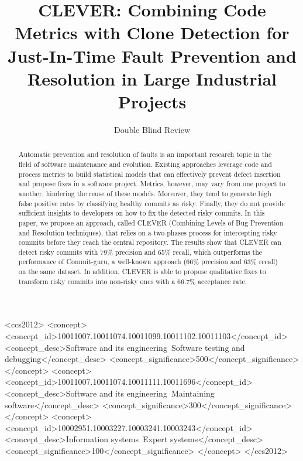 \documentclass[sigconf]{acmart}
\begin{document}
\title{CLEVER: Combining Code Metrics with Clone Detection for Just-In-Time
Fault Prevention and Resolution in Large Industrial Projects}

\author{Double Blind Review}
\affiliation{%
  \institution{}
 \streetaddress{}
  \city{} 
  \state{} 
  \postcode{}
}
\email{}


\renewcommand{\shorttitle}{Combining Code Metrics With Clone Detection For Faults Prevention and Resolution}

\begin{abstract}
Automatic prevention and resolution of faults is an important research
topic in the field of software maintenance and evolution. Existing
approaches leverage code and process metrics to build statistical models
that can effectively prevent defect insertion and propose fixes in a
software project. Metrics, however, may vary from one project to
another, hindering the reuse of these models. Moreover, they tend to
generate high false positive rates by classifying healthy commits as
risky. Finally, they do not provide sufficient insights to developers on
how to fix the detected risky commits. In this paper, we propose an
approach, called CLEVER (Combining Levels of Bug Prevention and
Resolution techniques), that relies on a two-phases process for
intercepting risky commits before they reach the central repository. The
results show that CLEVER can detect risky commits with 79\% precision
and 65\% recall, which outperforms the performance of Commit-guru, a
well-known approach (66\% precision and 63\% recall) on the same
dataset. In addition, CLEVER is able to propose qualitative fixes to
transform risky commits into non-risky ones with a 66.7\% acceptance
rate.
\end{abstract}

%
%
\begin{CCSXML}
<ccs2012>
<concept>
<concept_id>10011007.10011074.10011099.10011102.10011103</concept_id>
<concept_desc>Software and its engineering~Software testing and debugging</concept_desc>
<concept_significance>500</concept_significance>
</concept>
<concept>
<concept_id>10011007.10011074.10011111.10011696</concept_id>
<concept_desc>Software and its engineering~Maintaining software</concept_desc>
<concept_significance>300</concept_significance>
</concept>
<concept>
<concept_id>10002951.10003227.10003241.10003243</concept_id>
<concept_desc>Information systems~Expert systems</concept_desc>
<concept_significance>100</concept_significance>
</concept>
</ccs2012>
\end{CCSXML}
\end{document}
